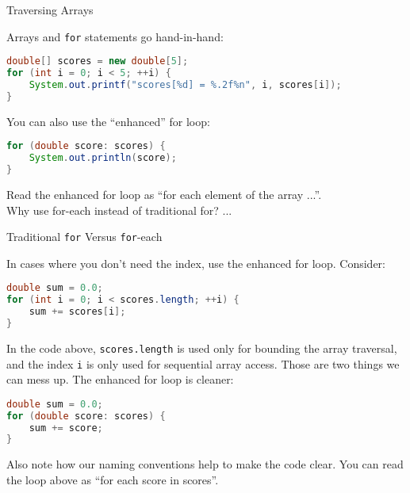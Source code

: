 \documentclass{beamer}
\begin{document}
\begin{frame}[fragile]{Traversing Arrays}


Arrays and {\tt for} statements go hand-in-hand:
\begin{lstlisting}[language=Java]
double[] scores = new double[5];
for (int i = 0; i < 5; ++i) {
    System.out.printf("scores[%d] = %.2f%n", i, scores[i]);
}
\end{lstlisting}

You can also use the ``enhanced'' for loop:

\begin{lstlisting}[language=Java]
for (double score: scores) {
    System.out.println(score);
}
\end{lstlisting}

Read the enhanced for loop as ``for each element of the array ...''.\\
\vspace{.1in}
Why use for-each instead of traditional for? ...

\end{frame}

\begin{frame}[fragile]{Traditional {\tt for} Versus {\tt for}-each}


In cases where you don't need the index, use the enhanced for loop.  Consider:
\vspace{-.05in}
\begin{lstlisting}[language=Java]
double sum = 0.0;
for (int i = 0; i < scores.length; ++i) {
    sum += scores[i];
}
\end{lstlisting}
\vspace{-.05in}
In the code above, {\tt scores.length} is used only for bounding the array traversal, and the index {\tt i} is only used for sequential array access.  Those are two things we can mess up.  The enhanced for loop is cleaner:

\begin{lstlisting}[language=Java]
double sum = 0.0;
for (double score: scores) {
    sum += score;
}
\end{lstlisting}

Also note how our naming conventions help to make the code clear.  You can read the loop above as ``for each score in scores''.

\end{frame}
\end{document}
